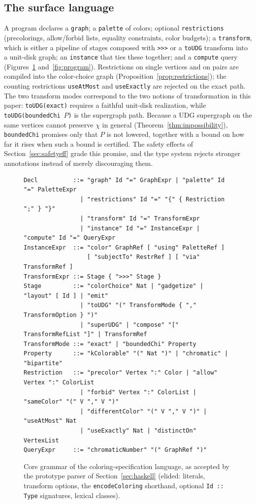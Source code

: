 \documentclass[a4paper,fleqn]{cas-sc}
\begin{document}
\subsection{The surface language}
\label{sec:surface}

A program declares a \texttt{graph}; a \texttt{palette} of colors; optional
\texttt{restrictions} (precolorings, allow/forbid lists, equality constraints, color
budgets); a \texttt{transform}, which is either a pipeline of stages composed with
\texttt{>>>} or a \texttt{toUDG} transform into a unit-disk graph; an
\texttt{instance} that ties these together; and a \texttt{compute} query
(Figures~\ref{fig:grammar} and~\ref{fig:program}). Restrictions on single vertices
and on pairs are compiled into the color-choice graph
(Proposition~\ref{prop:restrictions}); the counting restrictions \texttt{useAtMost}
and \texttt{useExactly} are rejected on the exact path. The two transform modes correspond
to the two notions of transformation in this paper: \texttt{toUDG(exact)} requires a
faithful unit-disk realization, while \texttt{toUDG(boundedChi}~$P$\texttt{)} is the
supergraph path. Because a UDG supergraph on the same vertices cannot preserve $\chi$
in general (Theorem~\ref{thm:impossibility}), \texttt{boundedChi} promises only that
$P$ is not lowered, together with a bound on how far it rises when such a bound is
certified. The safety effects of Section~\ref{sec:safetyeff} grade this promise, and
the type system rejects stronger annotations instead of merely discouraging them.

\begin{figure}[tb]
\small
\begin{lstlisting}[basicstyle=\ttfamily\scriptsize]
Decl          ::= "graph" Id "=" GraphExpr | "palette" Id "=" PaletteExpr
                | "restrictions" Id "=" "{" { Restriction ";" } "}"
                | "transform" Id "=" TransformExpr
                | "instance" Id "=" InstanceExpr | "compute" Id "=" QueryExpr
InstanceExpr  ::= "color" GraphRef [ "using" PaletteRef ]
                  [ "subjectTo" RestrRef ] [ "via" TransformRef ]
TransformExpr ::= Stage { ">>>" Stage }
Stage         ::= "colorChoice" Nat | "gadgetize" | "layout" [ Id ] | "emit"
                | "toUDG" "(" TransformMode { "," TransformOption } ")"
                | "superUDG" | "compose" "[" TransformRefList "]" | TransformRef
TransformMode ::= "exact" | "boundedChi" Property
Property      ::= "kColorable" "(" Nat ")" | "chromatic" | "bipartite"
Restriction   ::= "precolor" Vertex ":" Color | "allow" Vertex ":" ColorList
                | "forbid" Vertex ":" ColorList | "sameColor" "(" V "," V ")"
                | "differentColor" "(" V "," V ")" | "useAtMost" Nat
                | "useExactly" Nat | "distinctOn" VertexList
QueryExpr     ::= "chromaticNumber" "(" GraphRef ")"
\end{lstlisting}
\caption{Core grammar of the coloring-specification language, as accepted by the
prototype parser of Section~\ref{sec:haskell} (elided: literals,
transform options, the \texttt{encodeColoring} shorthand, optional
\texttt{Id :: Type} signatures, lexical classes).}
\label{fig:grammar}
\end{figure}
\end{document}
